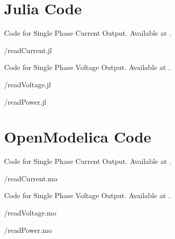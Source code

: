 \section{Julia Code}
\label{sec:modbus-julia-code}

\begin{juliacode}
{Code for Single Phase Current Output.
  Available at .}
\label{julia:current-modbus}

{\LocMODjuliacode/readCurrent.jl}
\end{juliacode}

\begin{juliacode}
{Code for Single Phase Voltage Output.
  Available at .}
\label{julia:voltage-modbus}

{\LocMODjuliacode/readVoltage.jl}
\end{juliacode}

\begin{juliacode}
\label{julia:modbus-power}

{\LocMODjuliacode/readPower.jl}
\end{juliacode}

\section{OpenModelica Code}
\label{sec:modbus-OpenModelica-code}

\begin{OpenModelicacode}
{Code for Single Phase Current Output.
  Available at .}
\label{OpenModelica:current-modbus}

{\LocMODOpenModelicacode/readCurrent.mo}
\end{OpenModelicacode}

\begin{OpenModelicacode}
{Code for Single Phase Voltage Output.
  Available at .}
\label{OpenModelica:voltage-modbus}

{\LocMODOpenModelicacode/readVoltage.mo}
\end{OpenModelicacode}

\begin{OpenModelicacode}
\label{OpenModelica:modbus-power}

{\LocMODOpenModelicacode/readPower.mo}
\end{OpenModelicacode}


